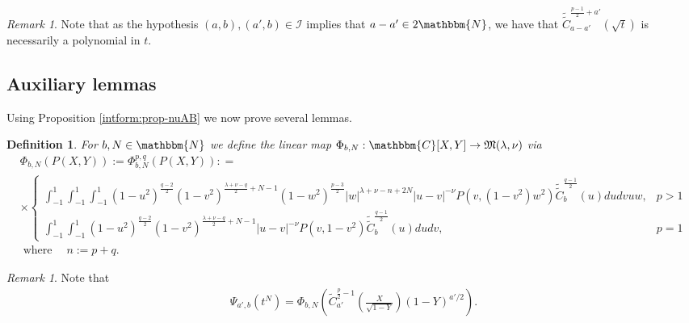 \documentclass{article}
\newcommand{\assign}{:=}
\newcommand{\tmop}[1]{\ensuremath{\operatorname{#1}}}
\newtheorem{definition}[proposition]{Definition}
\theoremstyle{remark}
\newtheorem{remark}[proposition]{Remark}
\begin{document}
\begin{remark}
  Note that as the hypothesis $(a, b), (a', b) \in \mathcal{I}$ implies that
  $a - a' \in 2\mathbbm{N}$, we have that $\widetilde{\tilde{C}}^{\frac{p -
  1}{2} + a'}_{a - a'} \left( \sqrt{t} \right)$ is necessarily a polynomial in
  $t$.
\end{remark}

\subsection{Auxiliary lemmas}

Using Proposition \ref{intform:prop-nuAB} we now prove several lemmas.

\begin{definition}
  \label{images:def-Psi}For $b, N \in \mathbbm{N}$ we define the linear map
  $\Phi_{b, N} : \mathbbm{C} [X, Y] \rightarrow \mathfrak{M} (\lambda, \nu)$
  via
  \begin{eqnarray}
    & \Phi_{b, N} (P (X, Y)) \assign \Phi_{b, N}^{p, q} (P (X, Y)) : = & 
    \nonumber\\
    & \times \left\{ \begin{array}{ll}
      \int_{- 1}^1 \int_{- 1}^1 \int_{- 1}^1 (1 - u^2)^{\frac{q - 2}{2}} (1 -
      v^2)^{\frac{\lambda + \nu - q}{2} + N - 1} (1 - w^2)^{\frac{p - 3}{2}} |
      w |^{\lambda + \nu - n + 2 N} | u - v |^{- \nu} P (v, (1 - v^2) w^2)
      \widetilde{\tilde{C}}^{\frac{q - 1}{2}}_b (u) d u d v u w, & p > 1\\
      \int_{- 1}^1 \int_{- 1}^1 (1 - u^2)^{\frac{q - 2}{2}} (1 -
      v^2)^{\frac{\lambda + \nu - q}{2} + N - 1} | u - v |^{- \nu} P (v, 1 -
      v^2) \widetilde{\tilde{C}}^{\frac{q - 1}{2}}_b (u) d u d v, & p = 1
    \end{array} \right. &  \nonumber\\
    & \tmop{where} \quad n \assign p + q. &  \nonumber
  \end{eqnarray}
\end{definition}

\begin{remark}
  \label{images:rem-def-Psi}Note that
  \begin{eqnarray}
    & \Psi_{a', b} (t^N) = \Phi_{b, N} \left( \tilde{C}_{a'}^{\frac{p}{2} -
    1} \left( \frac{X}{\sqrt{1 - Y}} \right) (1 - Y)^{a' / 2} \right) . & 
    \nonumber
  \end{eqnarray}
\end{remark}
\end{document}
